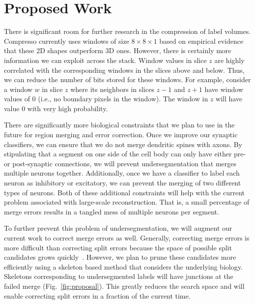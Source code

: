 \section{Proposed Work}

There is significant room for further research in the compression of label volumes.
Compresso currently uses windows of size $8 \times 8 \times 1$ based on empirical evidence that these 2D shapes outperform 3D ones.
However, there is certainly more information we can exploit across the stack.
Window values in slice $z$ are highly correlated with the corresponding windows in the slices above and below.
Thus, we can reduce the number of bits stored for these windows.
For example, consider a window $w$ in slice $z$ where its neighbors in slices $z - 1$ and $z + 1$ have window values of 0 (i.e., no boundary pixels in the window).
The window in $z$ will have value 0 with very high probability.

There are significantly more biological constraints that we plan to use in the future for region merging and error correction.
Once we improve our synaptic classifiers, we can ensure that we do not merge dendritic spines with axons. 
By stipulating that a segment on one side of the cell body can only have either pre- or post-synaptic connections, we will prevent undersegmentation that merges multiple neurons together.
Additionally, once we have a classifier to label each neuron as inhibitory or excitatory, we can prevent the merging of two different types of neurons.
Both of these additional constraints will help with the current problem associated with large-scale reconstruction.
That is, a small percentage of merge errors results in a tangled mess of multiple neurons per segment.

To further prevent this problem of undersegmentation, we will augment our current work to correct merge errors as well.
Generally, correcting merge errors is more difficult than correcting split errors because the space of possible split candidates grows quickly~\cite{parag2015properties}. 
However, we plan to prune these candidates more efficiently using a skeleton based method that considers the underlying biology.
Skeletons corresponding to undersegmented labels will have junctions at the failed merge (Fig.~\ref{fig:proposal}). 
This greatly reduces the search space and will enable correcting split errors in a fraction of the current time.

